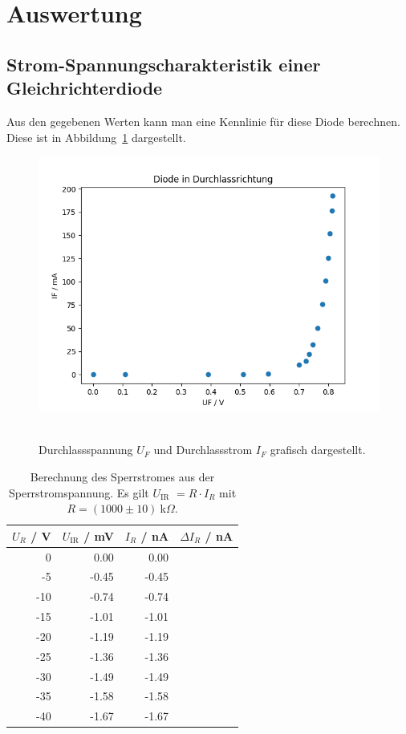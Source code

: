 \documentclass{article}
\newcommand{\UIR}{$U_\text{IR}$ }
\begin{document}
\section{Auswertung}

\subsection{Strom-Spannungscharakteristik einer Gleichrichterdiode}

Aus den gegebenen Werten kann man eine Kennlinie für diese Diode berechnen. Diese ist in Abbildung~\ref{fig:grafik_task1a} dargestellt. 
\begin{figure}[H]
\caption{Durchlassspannung $U_F$ und Durchlassstrom $I_F$ grafisch dargestellt.}
\label{fig:grafik_task1a}
{\centering
\includegraphics[scale=0.7]{bilder/task1a.png}
~
}
\end{figure}



\begin{table}[H]
\caption{Berechnung des Sperrstromes aus der Sperrstromspannung. Es gilt \UIR $= R\cdot I_R$ mit $R=(1000\pm10)~$k$\Omega$.}
\label{tab:task1b_auswertung}
\begin{tabular}{rr|rr}
$U_R$ / V & $U_\text{IR}$ / mV& $I_R$ / nA & $\Delta I_R$ / nA \\ \hline
0   &  0.00 & 0.00 \\
-5  & -0.45 & -0.45 \\
-10 & -0.74 & -0.74 \\
-15 & -1.01 & -1.01 \\
-20 & -1.19 & -1.19 \\
-25 & -1.36 & -1.36 \\
-30 & -1.49 & -1.49 \\
-35 & -1.58 & -1.58 \\
-40 & -1.67 & -1.67
\end{tabular}
\end{table}
\end{document}
